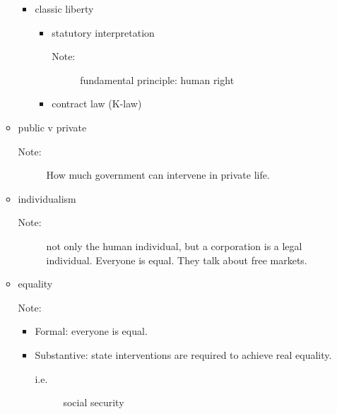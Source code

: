 \begin{itemize}
\begin{itemize}
\begin{itemize}
\begin{itemize}
                        \end{itemize}
                    \item classic liberty
                        \begin{itemize}
                            \item statutory interpretation 
                                \begin{description}
                                    \item[Note:] fundamental principle: human right 
                                \end{description}
                                \item contract law (K-law)
                        \end{itemize}
                \end{itemize}
            \item public v private
                \begin{description}
                    \item[Note:] How much government can intervene in private life. 
                \end{description}

            \item individualism
                \begin{description}
                    \item[Note:] not only the human individual, but a corporation is a legal individual. Everyone is equal. They talk about free markets. 
                \end{description}


            \item equality
                \begin{description}
                    \item[Note:]
                \end{description}

                \begin{itemize}
                    \item Formal: everyone is equal. 
                    \item Substantive: state interventions are required to achieve real equality. 
                        \begin{description}
                            \item[i.e.] social security 
                        \end{description}
                \end{itemize}


\end{itemize}
\end{itemize}
